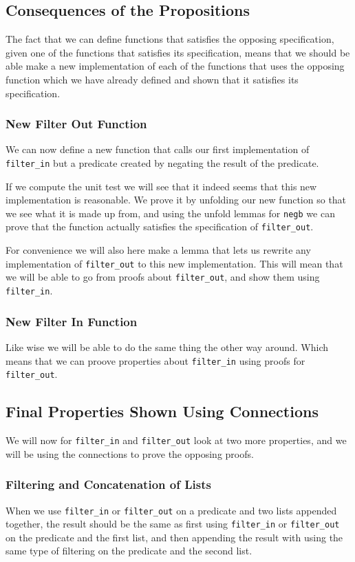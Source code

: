 \documentclass{article}
\begin{document}
\subsection{Consequences of the Propositions}
The fact that we can define functions that satisfies the opposing specification, given one of the functions that satisfies its specification, means that we should be able make a new implementation of each of the functions that uses the opposing function which we have already defined and shown that it satisfies its specification.

\subsubsection{New Filter Out Function}
We can now define a new function that calls our first implementation of \texttt{filter\_in} but a predicate created by negating the result of the predicate.

If we compute the unit test we will see that it indeed seems that this new implementation is reasonable. We prove it by unfolding our new function so that we see what it is made up from, and using the unfold lemmas for \texttt{negb} we can prove that the function actually satisfies the specification of \texttt{filter\_out}.

For convenience we will also here make a lemma that lets us rewrite any implementation of \texttt{filter\_out} to this new implementation. This will mean that we will be able to go from proofs about \texttt{filter\_out}, and show them using \texttt{filter\_in}.

\subsubsection{New Filter In Function}
Like wise we will be able to do the same thing the other way around. Which means that we can proove properties about \texttt{filter\_in} using proofs for \texttt{filter\_out}.

\subsection{Final Properties Shown Using Connections}
We will now for \texttt{filter\_in} and \texttt{filter\_out} look at two more properties, and we will be using the connections to prove the opposing proofs.

\subsubsection{Filtering and Concatenation of Lists}
When we use \texttt{filter\_in} or \texttt{filter\_out} on a predicate and two lists appended together, the result should be the same as first using \texttt{filter\_in} or \texttt{filter\_out} on the predicate and the first list, and then appending the result with using the same type of filtering on the predicate and the second list.
\end{document}
